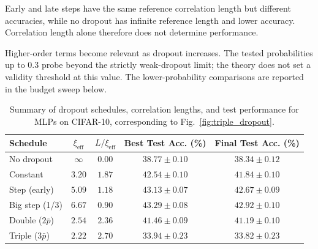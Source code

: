 Early and late steps have the same reference correlation length but different accuracies, while no dropout has infinite reference length and lower accuracy. Correlation length alone therefore does not determine performance.

Higher-order terms become relevant as dropout increases. The tested probabilities up to $0.3$ probe beyond the strictly weak-dropout limit; the theory does not set a validity threshold at this value. The lower-probability comparisons are reported in the budget sweep below.

\begin{table}[ht]
\caption{Summary of dropout schedules, correlation lengths, and test performance for MLPs on CIFAR-10, corresponding to Fig.~\ref{fig:triple_dropout}.}
\label{tab:triple_summary}
\centering
\begin{tabular}{lcccc}
\hline\hline
Schedule & $\xi_{\mathrm{eff}}$ & $L/\xi_{\mathrm{eff}}$ & Best Test Acc. (\%) & Final Test Acc. (\%) \\
\hline
No dropout & $\infty$ & $0.00$ & $38.77 \pm 0.10$ & $38.34 \pm 0.12$ \\
Constant & $3.20$ & $1.87$ & $42.54 \pm 0.10$ & $41.84 \pm 0.10$ \\
Step (early) & $5.09$ & $1.18$ & $43.13 \pm 0.07$ & $42.67 \pm 0.09$ \\
Big step (1/3) & $6.67$ & $0.90$ & $43.29 \pm 0.08$ & $42.92 \pm 0.10$ \\
Double ($2\bar{p}$) & $2.54$ & $2.36$ & $41.46 \pm 0.09$ & $41.19 \pm 0.10$ \\
Triple ($3\bar{p}$) & $2.22$ & $2.70$ & $33.94 \pm 0.23$ & $33.82 \pm 0.23$ \\
\hline\hline
\end{tabular}
\end{table}

